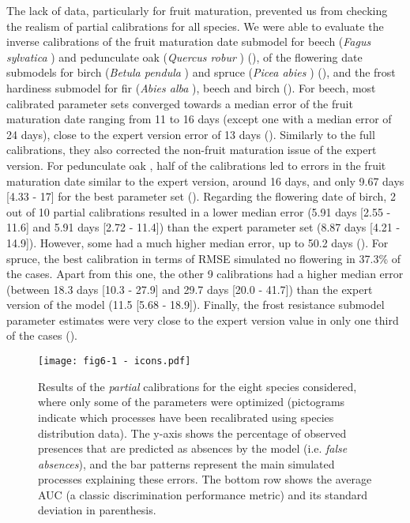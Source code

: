 \documentclass[preprint,12pt,authoryear]{elsarticle}
\begin{document}
The lack of data, particularly for fruit maturation, prevented us from checking the realism of partial calibrations for all species. We were able to evaluate the inverse calibrations of the fruit maturation date submodel for beech (\emph{\emph{Fagus sylvatica} }) and pedunculate oak (\emph{Quercus robur} ) (), of the flowering date submodels for birch (\emph{\emph{Betula pendula} }) and spruce  (\emph{\emph{Picea abies} }) (), and the frost hardiness submodel for fir (\emph{\emph{Abies alba} }), beech and birch (). For beech, most calibrated parameter sets converged towards a median error of the fruit maturation date ranging from 11 to 16 days (except one with a median error of 24 days), close to the expert version error of 13 days (). Similarly to the full calibrations, they also corrected the non-fruit maturation issue of the expert version. For pedunculate oak , half of the calibrations led to errors in the fruit maturation date similar to the expert version, around 16 days, and only 9.67 days [4.33 - 17] for the best parameter set (). Regarding the flowering date of birch, 2 out of 10 partial calibrations resulted in a lower median error (5.91 days [2.55 - 11.6] and 5.91 days [2.72 - 11.4]) than the expert parameter set (8.87 days [4.21 - 14.9]). However, some had a much higher median error, up to 50.2 days (). For spruce, the best calibration in terms of RMSE simulated no flowering in 37.3\% of the cases. Apart from this one, the other 9 calibrations had a higher median error (between 18.3 days [10.3 - 27.9] and 29.7 days [20.0 - 41.7]) than the expert version of the model (11.5 [5.68 - 18.9]). Finally, the frost resistance submodel parameter estimates were very close to the expert version value in only one third of the cases ().

\begin{figure}[hb]
\centering
\centerline{\texttt{[image: fig6-1 - icons.pdf]}}
\caption{Results of the \emph{partial} calibrations for the eight species considered, where only some of the parameters were optimized (pictograms indicate which processes have been recalibrated using species distribution data). The y-axis shows the percentage of observed presences that are predicted as absences by the model (i.e. \emph{false absences}), and the bar patterns represent the main simulated processes explaining these errors. The bottom row shows the average AUC (a classic discrimination performance metric) and its standard deviation in parenthesis.}
\label{fig:4}
\end{figure}
\end{document}
